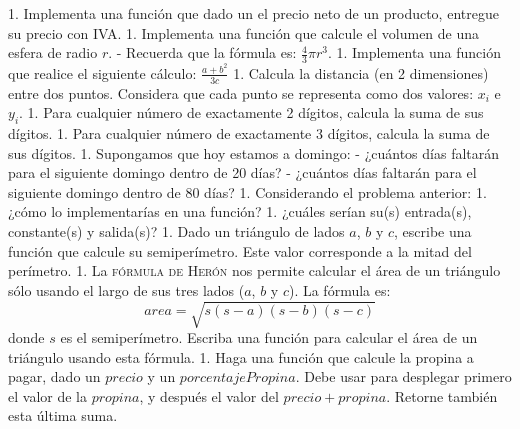 1. Implementa una función que dado un el precio neto de un producto, entregue su precio con IVA.
1. Implementa una función que calcule el volumen de una esfera de radio $r$.
    - Recuerda que la fórmula es: $\frac{4}{3}\pi r^3$.
1. Implementa una función que realice el siguiente cálculo: $\frac{a+b^2}{3c}$
1. Calcula la distancia (en 2 dimensiones) entre dos puntos. Considera que cada punto se representa
como dos valores: $x_i$ e $y_i$.
1. Para cualquier número de exactamente 2 dígitos, calcula la suma de sus dígitos.
1. Para cualquier número de exactamente 3 dígitos, calcula la suma de sus dígitos.
1. Supongamos que hoy estamos a domingo:
    - ¿cuántos días faltarán para el siguiente domingo dentro de 20 días?
    - ¿cuántos días faltarán para el siguiente domingo dentro de 80 días?
1. Considerando el problema anterior:
    1. ¿cómo lo implementarías en una función?
    1. ¿cuáles serían su(s) entrada(s), constante(s) y salida(s)?
1. Dado un triángulo de lados $a$, $b$ y $c$, escribe una función que calcule su semiperímetro. Este
valor corresponde a la mitad del perímetro.
1. La \textsc{fórmula de Herón} nos permite calcular el área de un triángulo sólo usando
el largo de sus tres lados ($a$, $b$ y $c$).
La fórmula es: $$ area = \sqrt{s (s-a) (s-b) (s-c)} $$ donde $s$ es el semiperímetro.
Escriba una función para calcular el área de un triángulo usando esta fórmula.
1. Haga una función que calcule la propina a pagar, dado un $precio$ y un $porcentajePropina$.
Debe usar  para desplegar primero el valor de la $propina$, y después
el valor del $precio + propina$. Retorne también esta última suma.
